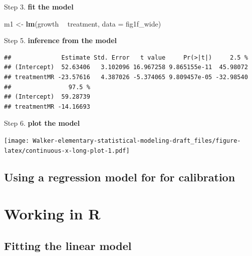 \documentclass[]{book}
\newenvironment{Shaded}{\begin{snugshade}}{\end{snugshade}}
\newcommand{\DataTypeTok}[1]{\textcolor[rgb]{0.13,0.29,0.53}{#1}}
\newcommand{\KeywordTok}[1]{\textcolor[rgb]{0.13,0.29,0.53}{\textbf{#1}}}
\newcommand{\NormalTok}[1]{#1}
\newcommand{\OperatorTok}[1]{\textcolor[rgb]{0.81,0.36,0.00}{\textbf{#1}}}
\newcommand{\StringTok}[1]{\textcolor[rgb]{0.31,0.60,0.02}{#1}}
\begin{document}
Step 3. \textbf{fit the model}

\begin{Shaded}
\begin{Highlighting}[]
\NormalTok{m1 <-}\StringTok{ }\KeywordTok{lm}\NormalTok{(growth }\OperatorTok{~}\StringTok{ }\NormalTok{treatment, }\DataTypeTok{data =}\NormalTok{ fig1f_wide)}
\end{Highlighting}
\end{Shaded}

Step 5. \textbf{inference from the model}

\begin{Shaded}
\end{Shaded}

\begin{verbatim}
##              Estimate Std. Error   t value     Pr(>|t|)     2.5 %
## (Intercept)  52.63406   3.102096 16.967258 9.865155e-11  45.98072
## treatmentMR -23.57616   4.387026 -5.374065 9.809457e-05 -32.98540
##                97.5 %
## (Intercept)  59.28739
## treatmentMR -14.16693
\end{verbatim}

Step 6. \textbf{plot the model}

\texttt{[image: Walker-elementary-statistical-modeling-draft\_files/figure-latex/continuous-x-long-plot-1.pdf]}

\hypertarget{using-a-regression-model-for-for-calibration}{%
\subsection{Using a regression model for for calibration}\label{using-a-regression-model-for-for-calibration}}

\hypertarget{working-in-r-1}{%
\section{Working in R}\label{working-in-r-1}}

\hypertarget{fitting-the-linear-model}{%
\subsection{Fitting the linear model}\label{fitting-the-linear-model}}
\end{document}
